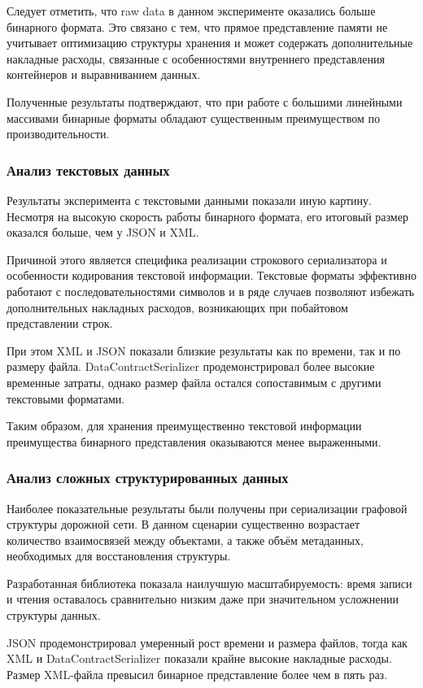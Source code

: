 \documentclass[coursework]{SCWorks}
\begin{document}
Следует отметить, что raw data в данном эксперименте оказались больше бинарного формата. Это связано с тем, что прямое представление памяти не учитывает оптимизацию структуры хранения и может содержать дополнительные накладные расходы, связанные с особенностями внутреннего представления контейнеров и выравниванием данных.

Полученные результаты подтверждают, что при работе с большими линейными массивами бинарные форматы обладают существенным преимуществом по производительности.

\subsubsection{Анализ текстовых данных}

Результаты эксперимента с текстовыми данными показали иную картину. Несмотря на высокую скорость работы бинарного формата, его итоговый размер оказался больше, чем у JSON и XML.

Причиной этого является специфика реализации строкового сериализатора и особенности кодирования текстовой информации. Текстовые форматы эффективно работают с последовательностями символов и в ряде случаев позволяют избежать дополнительных накладных расходов, возникающих при побайтовом представлении строк.

При этом XML и JSON показали близкие результаты как по времени, так и по размеру файла. DataContractSerializer продемонстрировал более высокие временные затраты, однако размер файла остался сопоставимым с другими текстовыми форматами.

Таким образом, для хранения преимущественно текстовой информации преимущества бинарного представления оказываются менее выраженными.

\subsubsection{Анализ сложных структурированных данных}

Наиболее показательные результаты были получены при сериализации графовой структуры дорожной сети. В данном сценарии существенно возрастает количество взаимосвязей между объектами, а также объём метаданных, необходимых для восстановления структуры.

Разработанная библиотека показала наилучшую масштабируемость: время записи и чтения оставалось сравнительно низким даже при значительном усложнении структуры данных.

JSON продемонстрировал умеренный рост времени и размера файлов, тогда как XML и DataContractSerializer показали крайне высокие накладные расходы. Размер XML-файла превысил бинарное представление более чем в пять раз.
\end{document}
